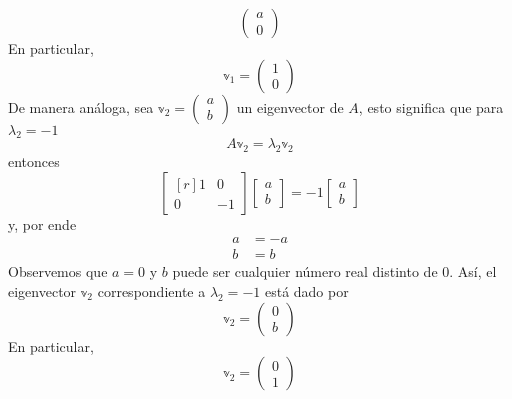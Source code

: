 \begin{example}
$$\begin{pmatrix}
        a \\
        0
    \end{pmatrix}$$
    En particular,
    $$\mathbb{v}_1 = \begin{pmatrix}
        1 \\
        0
    \end{pmatrix}$$
    De manera análoga, sea $\mathbb{v}_2 = \begin{pmatrix} a \\ b \end{pmatrix}$ un eigenvector de $A$, esto significa que para $\lambda_2 = -1$
    $$A \mathbb{v}_2 = \lambda_2 \mathbb{v}_2$$
    entonces
    $$\begin{bmatrix*}[r]
        1 & 0 \\
        0 & -1
    \end{bmatrix*} \begin{bmatrix}
        a \\
        b
    \end{bmatrix} = - 1 \begin{bmatrix}
        a \\
        b
    \end{bmatrix}$$
    y, por ende
    \begin{align*}
        a & = - a \\
        b & = b
    \end{align*}
    Observemos que $a = 0$ y $b$ puede ser cualquier número real distinto de $0$. Así, el eigenvector $\mathbb{v}_2$ correspondiente a $\lambda_2 = -1$ está dado por
    $$\mathbb{v}_2 = \begin{pmatrix}
        0 \\
        b
    \end{pmatrix}$$
    En particular,
    $$\mathbb{v}_2 = \begin{pmatrix}
        0 \\
        1
    \end{pmatrix}$$
\end{example}

